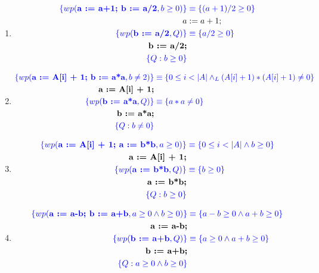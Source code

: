 \documentclass{article}
\begin{document}
\begin{enumerate}[label=\alph*)]
	\item
		
		\begin{align*}
		\color{blue}\{wp(\textbf{a := a+1; b := a/2}, b \geq 0)\} &\color{blue}
			\equiv \{(a+1)/2\geq 0\}\\
		a &:= a+1;\\
		\color{blue}\{wp(\textbf{b := a/2},Q)\}&\color{blue}\equiv \{a/2\geq 0\}\\
		\textbf{b := a/2;}\\
		\color{blue}\{Q:b \geq 0\}
		\end{align*}
		
	\item
		\begin{align*}
		\color{blue}\{wp(\textbf{a := A[i] + 1; b := a*a}, b\neq 2)\} &\color{blue}
			\equiv \{0\leq i<|A|\wedge_L (A[i] + 1)*(A[i] + 1)\neq 0\}\\
		\textbf{a := A[i] + 1;}\\
		\color{blue}\{wp(\textbf{b := a*a},Q)\}&\color{blue}\equiv \{a*a\neq 0\}\\
		\textbf{b := a*a;}\\
		\color{blue}\{Q:b \neq 0\}
		\end{align*}
	\item
		\begin{align*}
		\color{blue}\{wp(\textbf{a := A[i] + 1; a := b*b}, a \geq 0)\} &\color{blue}
			\equiv \{0\leq i<|A|\wedge b\geq 0\}\\
		\textbf{a := A[i] + 1;}\\
		\color{blue}\{wp(\textbf{a := b*b},Q)\}&\color{blue}\equiv \{b\geq 0\}\\
		\textbf{a := b*b;}\\
		\color{blue}\{Q:b \geq 0\}
		\end{align*}
	\item
		\begin{align*}
		\color{blue}\{wp(\textbf{a := a-b; b := a+b}, a \geq 0 \wedge b \geq 0)\} &\color{blue}
			\equiv \{a-b \geq 0 \wedge a+b \geq 0\}\\
		\textbf{a := a-b;}\\
		\color{blue}\{wp(\textbf{b := a+b},Q)\}&\color{blue}
			\equiv \{a \geq 0 \wedge a+b \geq 0\}\\
		\textbf{b := a+b;}\\
		\color{blue}\{Q:a \geq 0 \wedge b \geq 0\}
		\end{align*}
\end{enumerate}
\end{document}
